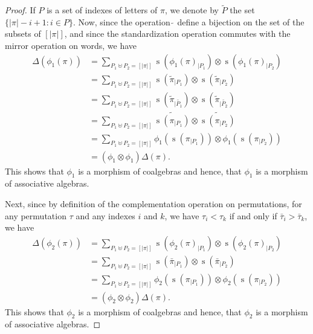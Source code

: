 \documentclass[a4paper,10pt]{llncs}
\DeclareMathOperator{\STD}{\mathrm{s}}
\begin{document}
\begin{proof}
    If $P$ is a set of indexes of letters of $\pi$, we denote by
    $\widetilde{P}$ the set $\{|\pi| - i  + 1 : i \in P\}$. Now, since
    the operation $\widetilde{\,}$ define a bijection on the set of the
    subsets of $[|\pi|]$, and since the standardization operation
    commutes with the mirror operation on words, we have
    \begin{equation} \begin{split}
        \Delta(\phi_1(\pi))
        & = \sum_{P_1 \uplus P_2 = [|\pi|]}
        \STD\left(\phi_1(\pi)_{|P_1}\right)
        \otimes \STD\left(\phi_1(\pi)_{|P_2}\right) \\
        & = \sum_{P_1 \uplus P_2 = [|\pi|]}
        \STD\left(\widetilde{\pi}_{|P_1}\right)
        \otimes \STD\left(\widetilde{\pi}_{|P_2}\right) \\
        & = \sum_{P_1 \uplus P_2 = [|\pi|]}
        \STD\left(\widetilde{\pi}_{|\widetilde{P_1}}\right)
        \otimes \STD\left(\widetilde{\pi}_{|\widetilde{P_2}}\right) \\
        & = \sum_{P_1 \uplus P_2 = [|\pi|]}
        \widetilde{\STD\left(\pi_{|P_1}\right)}
        \otimes \widetilde{\STD\left(\pi_{|P_2}\right)} \\
        & = \sum_{P_1 \uplus P_2 = [|\pi|]}
        \phi_1\left(\STD\left(\pi_{|P_1}\right)\right)
        \otimes \phi_1\left(\STD\left(\pi_{|P_2}\right)\right) \\
        & = (\phi_1 \otimes \phi_1) \Delta(\pi).
    \end{split} \end{equation}
    This shows that $\phi_1$ is a morphism of coalgebras and hence, that
    $\phi_1$ is a morphism of associative algebras.
    \smallskip

    Next, since by definition of the complementation operation on
    permutations, for any permutation $\tau$ and any indexes $i$ and $k$,
    we have $\tau_i < \tau_k$ if and only if $\bar \tau_i > \bar \tau_k$,
    we have
    \begin{equation} \begin{split}
        \Delta(\phi_2(\pi))
        & = \sum_{P_1 \uplus P_2 = [|\pi|]}
        \STD\left(\phi_2(\pi)_{|P_1}\right)
        \otimes \STD\left(\phi_2(\pi)_{|P_2}\right) \\
        & = \sum_{P_1 \uplus P_2 = [|\pi|]}
        \STD\left(\bar \pi_{|P_1}\right)
        \otimes \STD\left(\bar \pi_{|P_2}\right) \\
        & = \sum_{P_1 \uplus P_2 = [|\pi|]}
        \phi_2\left(\STD\left(\pi_{|P_1}\right)\right)
        \otimes \phi_2\left(\STD\left(\pi_{|P_2}\right)\right) \\
        & = (\phi_2 \otimes \phi_2) \Delta(\pi).
    \end{split} \end{equation}
    This shows that $\phi_2$ is a morphism of coalgebras and hence, that
    $\phi_2$ is a morphism of associative algebras.
    \smallskip


\end{proof}
\end{document}
